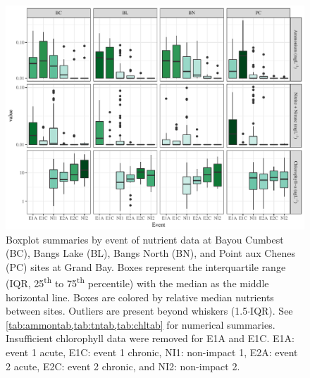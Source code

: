 \documentclass[letterpaper,12pt]{article}\usepackage[]{graphicx}\usepackage[]{color}
\makeatletter
\def\maxwidth{ %
  \ifdim\Gin@nat@width>\linewidth
    \linewidth
  \else
    \Gin@nat@width
  \fi
}
\newcommand{\beginsupplement}{%
        \setcounter{table}{0}
        \renewcommand{\thetable}{S\arabic{table}}%
        \setcounter{figure}{0}
        \renewcommand{\thefigure}{S\arabic{figure}}%
     }
\makeatother
\begin{document}
\clearpage

\beginsupplement

\begin{figure}[!ht]

{\centering \includegraphics[width=\maxwidth]{figs/FigS1} 

}

\caption{Boxplot summaries by event of nutrient data at Bayou Cumbest (BC), Bangs Lake (BL), Bangs North (BN), and Point aux Chenes (PC) sites at Grand Bay.  Boxes represent the interquartile range (IQR, 25\textsuperscript{th} to 75\textsuperscript{th} percentile) with the median as the middle horizontal line.  Boxes are colored by relative median nutrients between sites.  Outliers are present beyond whiskers (1.5$\cdot$IQR). See \cref{tab:ammontab,tab:tntab,tab:chltab} for numerical summaries.  Insufficient chlorophyll data were removed for E1A and E1C. E1A: event 1 acute, E1C: event 1 chronic, NI1: non-impact 1, E2A: event 2 acute, E2C: event 2 chronic, and NI2: non-impact 2.}\label{fig:FigS1}
\end{figure}


\clearpage
\end{document}

